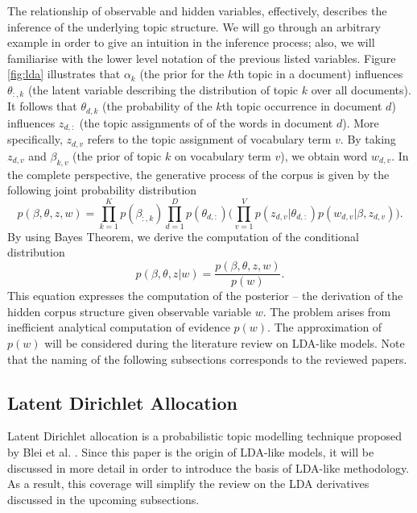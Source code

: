 \documentclass{mprop}
\begin{document}
\par The relationship of observable and hidden variables, effectively, describes the inference of the underlying topic structure. We will go through an arbitrary example in order to give an intuition in the inference process; also, we will familiarise with the lower level notation of the previous listed variables. Figure \ref{fig:lda} illustrates that $\alpha_k$ (the prior for the $k$th topic in a document) influences $\theta_{:, k}$ (the latent variable describing the distribution of topic $k$ over all documents). It follows that $\theta_{d, k}$ (the probability of the $k$th topic occurrence in document $d$) influences $z_{d, :}$ (the topic assignments of of the words in document $d$). More specifically, $z_{d, v}$ refers to the topic assignment of vocabulary term $v$. By taking $z_{d, v}$ and $\beta_{k, v}$ (the prior of topic $k$ on vocabulary term $v$), we obtain word $w_{d, v}$. In the complete perspective, the generative process of the corpus is given by the following joint probability distribution
\begin{equation}
p(\beta, \theta, z, w) = \prod_{k=1}^Kp(\beta_{:, k})\prod_{d=1}^Dp(\theta_{d, :})\bigg(\prod_{v=1}^Vp(z_{d, v} | \theta_{d, :})p(w_{d, v} | \beta, z_{d, v})\bigg).
\end{equation}
By using Bayes Theorem, we derive the computation of the conditional distribution
\begin{equation}
p(\beta, \theta, z | w) = \frac{p(\beta, \theta, z, w)}{p(w)}. 
\end{equation}
This equation expresses the computation of the posterior -- the derivation of the hidden corpus structure given observable variable $w$. The problem arises from inefficient analytical computation of evidence $p(w)$. The approximation of $p(w)$ will be considered during the literature review on LDA-like models. Note that the naming of the following subsections corresponds to the reviewed papers. 

\subsection{Latent Dirichlet Allocation}

\par Latent Dirichlet allocation is a probabilistic topic modelling technique proposed by Blei et al. \cite{blei_2003}. Since this paper is the origin of LDA-like models, it will be discussed in more detail in order to introduce the basis of LDA-like methodology. As a result, this coverage will simplify the review on the LDA derivatives discussed in the upcoming subsections. 
\end{document}
